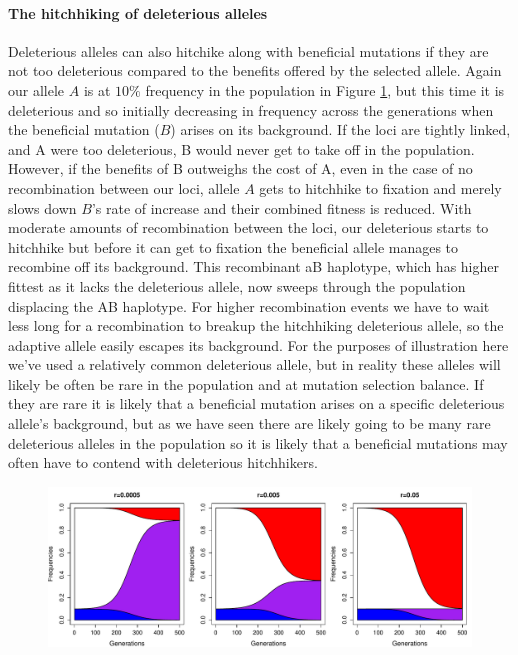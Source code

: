 \paragraph{The hitchhiking of deleterious alleles}
Deleterious alleles can also hitchike along with beneficial mutations if they are not too deleterious compared to the benefits offered by the selected allele. Again our allele $A$ is at $10\%$ frequency in the population in Figure \ref{fig:deleterious_HH}, but this time it is deleterious and so initially decreasing in frequency across the generations when the beneficial mutation ($B$) arises on its background. If the loci are tightly linked, and A were too deleterious, B would never get to take off in the population.   However, if the benefits of B outweighs the cost of A, even in the case of no recombination between our loci, allele $A$ gets to hitchhike to fixation and merely slows down $B$'s rate of increase and their combined fitness is reduced. With moderate amounts of recombination between the loci, our deleterious starts to hitchhike but before it can get to fixation the beneficial allele manages to recombine off its background. This recombinant aB haplotype, which has higher fittest as it lacks the deleterious allele, now sweeps through the population displacing the AB haplotype. For higher recombination events we have to wait less long for a recombination to breakup the hitchhiking deleterious allele, so the adaptive allele easily escapes its background.
For the purposes of illustration here we've used a relatively common deleterious allele, but in reality these alleles will likely be often be rare in the population and at mutation selection balance. If they are rare it is likely that a beneficial mutation arises on a specific deleterious allele's background, but as we have seen there are likely going to be many rare deleterious alleles in the population so it is likely that a beneficial mutations may often have to contend with deleterious hitchhikers. 
\begin{figure}
\begin{center}
  \includegraphics[width = 0.9 \textwidth]{figures/selection_recom_interaction/Deleterious_Hitchhiking.pdf}
  \caption{} \label{fig:deleterious_HH}  %
  \end{center}
\end{figure}


